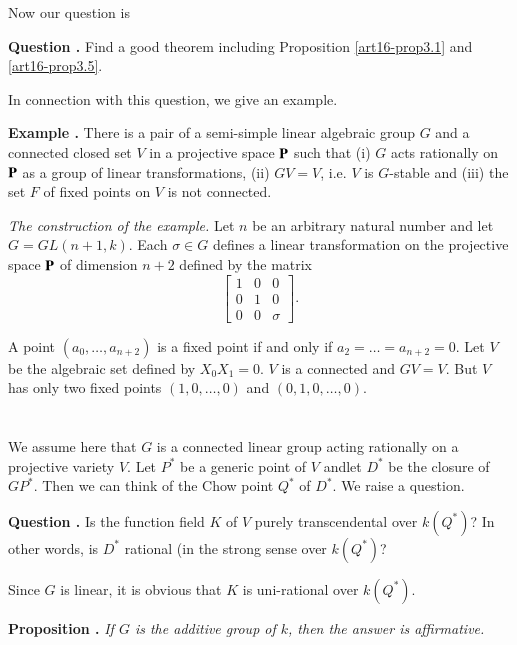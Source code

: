 Now our question is

\medskip
\noindent
{\bf Question .\label{art16-ques3.6}}
Find a good theorem including Proposition \ref{art16-prop3.1} and \ref{art16-prop3.5}.
\smallskip

In connection with this question, we give an example.

\medskip
\noindent
{\bf Example .\label{art16-exam3.7}}
There is a pair of a semi-simple linear algebraic group $G$ and a connected closed set $V$ in a projective space $\mathbf{P}$ such that (i) $G$ acts rationally on $\mathbf{P}$ as a group of linear transformations, (ii) $GV=V$, i.e. $V$ is $G$-stable and (iii) the set $F$ of fixed points on $V$ is not connected.
\smallskip

{\em The construction of the example.} Let $n$ be an arbitrary natural number and let $G=GL(n+1,k)$. Each $\sigma\in G$ defines a linear transformation on the projective space $\mathbf{P}$ of dimension $n+2$ defined by the matrix
$$
\begin{bmatrix}
1 & 0 & 0\\
0 & 1 & 0\\
0 & 0 & \sigma
\end{bmatrix}.
$$  

A point $(a_{0},\ldots,a_{n+2})$ is a fixed point if and only if $a_{2}=\ldots=a_{n+2}=0$. Let $V$ be the algebraic set defined by $X_{0}X_{1}=0$. $V$ is a connected and $GV=V$. But $V$ has only two fixed points $(1,0,\ldots,0)$ and $(0,1,0,\ldots,0)$.

\medskip

\section{}\label{art16-sec4}
We assume here that $G$ is a connected linear group acting rationally on a projective variety $V$. Let $P^{*}$ be a generic point of $V$ and\pageoriginale let $D^{*}$ be the closure of $GP^{*}$. Then we can think of the Chow point $Q^{*}$ of $D^{*}$. We raise a question.

\medskip
\noindent
{\bf Question .\label{art16-ques4.1}}
Is the function field $K$ of $V$ purely transcendental over $k(Q^{*})$? In other words, is $D^{*}$ rational (in the strong sense over $k(Q^{*})$?
\smallskip

Since $G$ is linear, it is obvious that $K$ is uni-rational over $k(Q^{*})$.

\medskip
\noindent
{\bf Proposition .\label{art16-prop4.2}}
{\em If $G$ is the additive group of $k$, then the answer is affirmative.}
\smallskip

